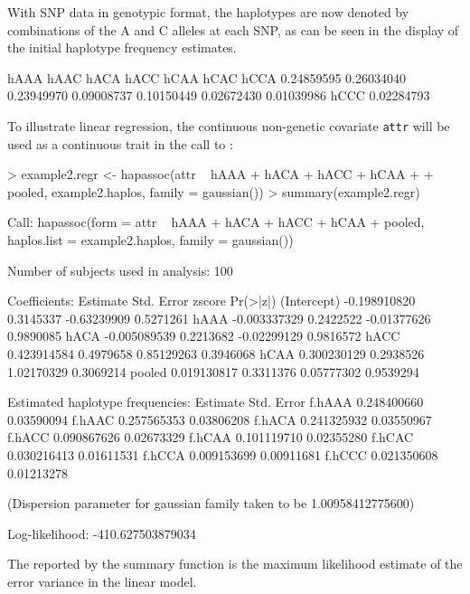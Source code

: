 \documentclass[article, shortnames]{jss}
\begin{document}
With SNP data in genotypic format, the haplotypes are now denoted by 
combinations of the A and C alleles at each SNP, as can be seen 
in the display of the initial haplotype frequency estimates.
\begin{Schunk}
\begin{Soutput}
      hAAA       hAAC       hACA       hACC       hCAA       hCAC       hCCA 
0.24859595 0.26034040 0.23949970 0.09008737 0.10150449 0.02672430 0.01039986 
      hCCC 
0.02284793 
\end{Soutput}
\end{Schunk}

To illustrate linear regression, the continuous non-genetic covariate 
{\tt attr} will be used as a continuous trait in the call to :

\begin{Schunk}
\begin{Sinput}
> example2.regr <- hapassoc(attr ~ hAAA + hACA + hACC + hCAA + 
+     pooled, example2.haplos, family = gaussian())
> summary(example2.regr)
\end{Sinput}
\begin{Soutput}
Call:
hapassoc(form = attr ~ hAAA + hACA + hACC + hCAA + pooled, haplos.list = example2.haplos, 
    family = gaussian())

Number of subjects used in analysis: 100 

Coefficients:
                Estimate Std. Error      zscore  Pr(>|z|)
(Intercept) -0.198910820  0.3145337 -0.63239909 0.5271261
hAAA        -0.003337329  0.2422522 -0.01377626 0.9890085
hACA        -0.005089539  0.2213682 -0.02299129 0.9816572
hACC         0.423914584  0.4979658  0.85129263 0.3946068
hCAA         0.300230129  0.2938526  1.02170329 0.3069214
pooled       0.019130817  0.3311376  0.05777302 0.9539294

Estimated haplotype frequencies:
          Estimate Std. Error
f.hAAA 0.248400660 0.03590094
f.hAAC 0.257565353 0.03806208
f.hACA 0.241325932 0.03550967
f.hACC 0.090867626 0.02673329
f.hCAA 0.101119710 0.02355280
f.hCAC 0.030216413 0.01611531
f.hCCA 0.009153699 0.00911681
f.hCCC 0.021350608 0.01213278

(Dispersion parameter for gaussian family taken to be 1.00958412775600)

Log-likelihood: -410.627503879034 
\end{Soutput}
\end{Schunk}
The  reported by the summary function
is the maximum likelihood estimate of the error variance in the linear
model.
\end{document}
